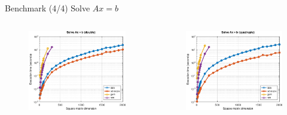 \begin{frame}{Benchmark (4/4) Solve $Ax = b$}

\begin{columns}
\begin{column}{0.3\textwidth}
\begin{figure}
\centering
\includegraphics[width=1.0\linewidth]{res/data/2021-11-24_run-01-lin-double-semilogy}
\end{figure}
\end{column}
\begin{column}{0.3\textwidth}
\begin{figure}
\centering
\includegraphics[width=1.0\linewidth]{res/data/2021-11-24_run-01-lin-quadruple-semilogy}

\end{figure}
\end{column}
\end{columns}
\end{frame}
